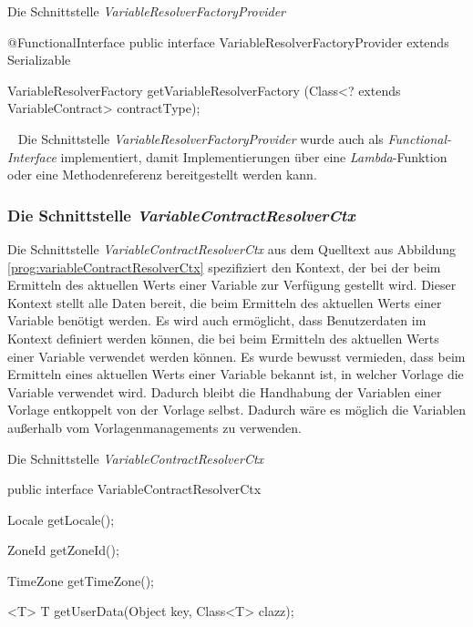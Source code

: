 \begin{program}[h]
\caption{Die Schnittstelle \emph{VariableResolverFactoryProvider}}
\label{prog:variableResolverFactoryProvider}
\begin{JavaCode}
@FunctionalInterface
public interface VariableResolverFactoryProvider extends Serializable {

    VariableResolverFactory getVariableResolverFactory
            (Class<? extends VariableContract> contractType);
}
\end{JavaCode}
\end{program}
\ \newline
Die Schnittstelle \emph{VariableResolverFactoryProvider} wurde auch als \emph{Functional-Interface} implementiert, damit Implementierungen über eine \emph{Lambda}-Funktion oder eine Methodenreferenz bereitgestellt werden kann.

\subsubsection{Die Schnittstelle \emph{VariableContractResolverCtx}}
\label{sec:variableResolverFactoryProvider}
Die Schnittstelle \emph{VariableContractResolverCtx} aus dem Quelltext aus Abbildung \ref{prog:variableContractResolverCtx} spezifiziert den Kontext, der bei der beim Ermitteln des aktuellen Werts einer Variable zur Verfügung gestellt wird. Dieser Kontext stellt alle Daten bereit, die beim Ermitteln des aktuellen Werts einer Variable benötigt werden. Es wird auch ermöglicht, dass Benutzerdaten im Kontext definiert werden können, die bei beim Ermitteln des aktuellen Werts einer Variable verwendet werden können. Es wurde bewusst vermieden, dass beim Ermitteln eines aktuellen Werts einer Variable bekannt ist, in welcher Vorlage die Variable verwendet wird. Dadurch bleibt die Handhabung der Variablen einer Vorlage entkoppelt von der Vorlage selbst. Dadurch wäre es möglich die Variablen außerhalb vom Vorlagenmanagements zu verwenden.

\begin{program}[h]
\caption{Die Schnittstelle \emph{VariableContractResolverCtx}}
\label{prog:variableContractResolverCtx}
\begin{JavaCode}
public interface VariableContractResolverCtx {

    Locale getLocale();

    ZoneId getZoneId();

    TimeZone getTimeZone();

    <T> T getUserData(Object key,
                      Class<T> clazz);
}
\end{JavaCode}
\end{program}

